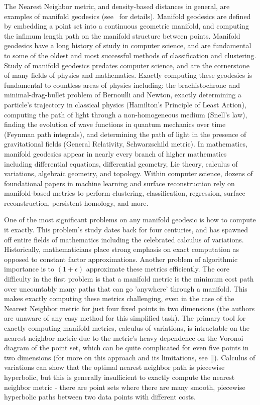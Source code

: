 The Nearest Neighbor metric, and density-based distances in general, are
examples of manifold geodesics (see~\cite{} for details). Manifold
geodesics are defined by embedding a point set into a continuous geometric
manifold, and computing the infimum length path on the manifold structure
between points. Manifold geodesics have a long history of study in computer
science, and are fundamental to some of the oldest and most successful
methods of classification and clustering. Study of manifold geodesics
predates computer science, and are the cornerstone of many fields of
physics and mathematics. Exactly computing these geodesics is fundamental
to countless areas of physics including: the brachistochrone and
minimal-drag-bullet problem of Bernoulli and Newton, exactly determining a
particle's trajectory in classical physics (Hamilton's Principle of Least
Action), computing the path of light through a non-homogeneous medium
(Snell's law), finding the evolution of wave functions in quantum mechanics
over time (Feynman path integrals), and determining the path of light in
the presence of gravitational fields (General Relativity, Schwarzschild
metric). In mathematics, manifold geodesics appear in nearly every branch
of higher mathematics including differential equations, differential
geometry, Lie theory, calculus of variations, algebraic geometry, and
topology.  Within computer science, dozens of foundational papers in
machine learning and surface reconstruction rely on manifold-based metrics
to perform clustering, classification, regression, surface reconstruction,
persistent homology, and more.

One of the most significant problems on any manifold geodesic is how to
compute it exactly. This problem's study dates back for four centuries, and
has spawned off entire fields of mathematics including the celebrated
calculus of variations. Historically, mathematicians place strong emphasis
on exact computation as opposed to constant factor approximations.  Another
problem of algorithmic importance is to $(1+\epsilon)$ approximate these
metrics efficiently.  The core difficulty in the first problem is that a
manifold metric is the minimum cost path over uncountably many paths that
can go 'anywhere' through a manifold. This makes exactly computing these
metrics challenging, even in the case of the Nearest Neighbor metric for
just four fixed points in two dimensions (the authors are unaware of any
easy method for this simplified task). The primary tool for exactly
computing manifold metrics, calculus of variations, is intractable on the
nearest neighbor metric due to the metric's heavy dependence on the Voronoi
diagram of the point set, which can be quite complicated for even five
points in two dimensions (for more on this approach and its limitations,
see []). Calculus of variations can show that the optimal nearest neighbor
path is piecewise hyperbolic, but this is generally insufficient to exactly
compute the nearest neighbor metric - there are point sets where there are
many smooth, piecewise hyperbolic paths between two data points with
different costs.


